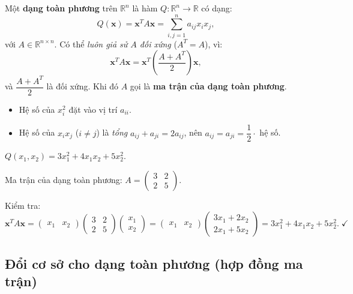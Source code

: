 \documentclass[12pt,a4paper]{article}
\begin{document}
\begin{dinhnghia}
  Một \textbf{dạng toàn phương} trên $\mathbb{R}^n$ là hàm $Q: \mathbb{R}^n \to \mathbb{R}$ có dạng:
  \[
    Q(\mathbf{x}) = \mathbf{x}^T A \mathbf{x} = \sum_{i,j=1}^n a_{ij} x_i x_j,
  \]
  với $A \in \mathbb{R}^{n\times n}$. Có thể \emph{luôn giả sử $A$ đối xứng} ($A^T = A$), vì:
  \[
    \mathbf{x}^T A \mathbf{x} = \mathbf{x}^T \left(\dfrac{A + A^T}{2}\right) \mathbf{x},
  \]
  và $\dfrac{A+A^T}{2}$ là đối xứng. Khi đó $A$ gọi là \textbf{ma trận của dạng toàn phương}.
\end{dinhnghia}

\begin{phuongphap}[title={Đọc ma trận $A$ từ biểu thức $Q(\mathbf{x})$}]
\begin{itemize}
  \item Hệ số của $x_i^2$ đặt vào vị trí $a_{ii}$.
  \item Hệ số của $x_i x_j$ ($i \ne j$) là \emph{tổng} $a_{ij} + a_{ji} = 2 a_{ij}$, nên $a_{ij} = a_{ji} = \dfrac{1}{2}\cdot$ hệ số.
\end{itemize}
\end{phuongphap}

\begin{vidu}
$Q(x_1, x_2) = 3x_1^2 + 4 x_1 x_2 + 5x_2^2$.

Ma trận của dạng toàn phương: $A = \begin{pmatrix}3 & 2\\ 2 & 5\end{pmatrix}.$

Kiểm tra:
\[
  \mathbf{x}^T A \mathbf{x}
  = \begin{pmatrix}x_1 & x_2\end{pmatrix}
    \begin{pmatrix}3 & 2\\ 2 & 5\end{pmatrix}
    \begin{pmatrix}x_1 \\ x_2\end{pmatrix}
  = \begin{pmatrix}x_1 & x_2\end{pmatrix}
    \begin{pmatrix}3x_1 + 2x_2\\ 2x_1 + 5x_2\end{pmatrix}
  = 3x_1^2 + 4x_1 x_2 + 5x_2^2. \;\checkmark
\]
\end{vidu}

\subsection{Đổi cơ sở cho dạng toàn phương (hợp đồng ma trận)}
\end{document}
